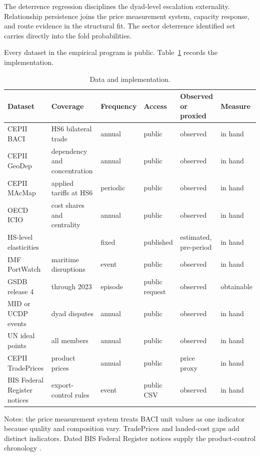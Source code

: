 \documentclass[11pt]{article}
\theoremstyle{definition}
\begin{document}
The deterrence regression disciplines the dyad-level escalation externality. Relationship persistence joins the price measurement system, capacity response, and route evidence in the structural fit. The sector deterrence identified set carries directly into the fold probabilities.

Every dataset in the empirical program is public. Table~\ref{tab:feas3} records the implementation.

\begin{table}[t]
\centering
\caption{Data and implementation.}
\label{tab:feas3}
\footnotesize
\setlength{\tabcolsep}{4pt}
\begin{tabular}{p{3.3cm}p{2.8cm}p{1.5cm}p{1.6cm}p{2.6cm}p{1.6cm}}
\toprule
Dataset & Coverage & Frequency & Access & Observed or proxied & Measure \\
\midrule
CEPII BACI & HS6 bilateral trade & annual & public & observed & in hand \\
CEPII GeoDep & dependency and concentration & annual & public & observed & in hand \\
CEPII MAcMap & applied tariffs at HS6 & periodic & public & observed & in hand \\
OECD ICIO & cost shares and centrality & annual & public & observed & in hand \\
HS-level elasticities & \citet{BrodaWeinstein2006} & fixed & published & estimated, pre-period & in hand \\
IMF PortWatch & maritime disruptions & event & public & observed & in hand \\
GSDB release 4 & through 2023 & episode & public request & observed & obtainable \\
MID or UCDP events & dyad disputes & annual & public & observed & in hand \\
UN ideal points & all members & annual & public & observed & in hand \\
CEPII TradePrices & product prices & annual & public & price proxy & in hand \\
BIS Federal Register notices & export-control rules & event & public CSV & observed & in hand \\
\bottomrule
\end{tabular}
\par\smallskip
\begin{minipage}{0.95\textwidth}
\footnotesize Notes: the price measurement system treats BACI unit values as one indicator because quality and composition vary. TradePrices and landed-cost gaps add distinct indicators. Dated BIS Federal Register notices supply the product-control chronology \citep{BISFederalRegister}.
\end{minipage}
\end{table}
\end{document}
